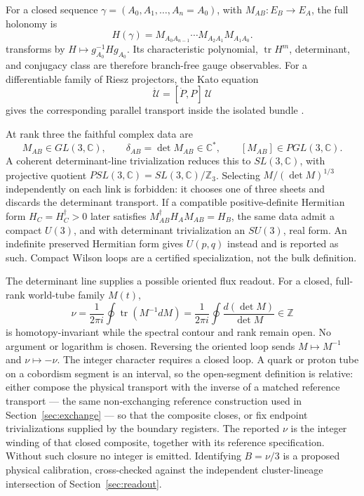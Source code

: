 \documentclass[11pt,letterpaper]{article}
\begin{document}
For a closed sequence
$\gamma=(A_0,A_1,\ldots,A_n=A_0)$, with $M_{AB}:E_B\to E_A$, the full
holonomy is
\begin{equation*}
  H(\gamma)
  =M_{A_0A_{n-1}}\cdots M_{A_2A_1}M_{A_1A_0}.
\end{equation*}
transforms by $H\mapsto g_{A_0}^{-1}Hg_{A_0}$. Its characteristic polynomial,
$\operatorname{tr}H^m$, determinant, and conjugacy class are therefore
branch-free gauge observables. For a differentiable family of Riesz
projectors, the Kato equation
\begin{equation*}
  \dot{\mathcal U}=[\dot P,P]\,\mathcal U
\end{equation*}
gives the corresponding parallel transport inside the isolated bundle
\cite{kato1995}.

At rank three the faithful complex data are
\begin{equation*}
  M_{AB}\in GL(3,\mathbb C),\qquad
  \delta_{AB}=\det M_{AB}\in\mathbb C^{*},\qquad
  [M_{AB}]\in PGL(3,\mathbb C).
\end{equation*}
A coherent determinant-line trivialization reduces this to
$SL(3,\mathbb C)$, with projective quotient
$PSL(3,\mathbb C)=SL(3,\mathbb C)/\mathbb Z_3$. Selecting
$M/(\det M)^{1/3}$ independently on each link is forbidden: it chooses one of
three sheets and discards the determinant transport. If a compatible
positive-definite Hermitian form $H_C=H_C^\dagger>0$ later satisfies
$M_{AB}^{\dagger}H_AM_{AB}=H_B$, the same data admit a compact
$U(3)$, and with determinant trivialization an $SU(3)$, real form. An
indefinite preserved Hermitian form gives $U(p,q)$ instead and is reported as
such. Compact Wilson loops are a certified specialization, not the bulk
definition.

The determinant line supplies a possible oriented flux readout. For a closed,
full-rank world-tube family $M(t)$,
\begin{equation*}
  \boxed{\,
  \nu=\frac{1}{2\pi i}\oint
  \operatorname{tr}\!\left(M^{-1}dM\right)
  =\frac{1}{2\pi i}\oint\frac{d(\det M)}{\det M}
  \in\mathbb Z\,}
\end{equation*}
is homotopy-invariant while the spectral contour and rank remain open. No
argument or logarithm is chosen. Reversing the oriented loop sends
$M\mapsto M^{-1}$ and $\nu\mapsto-\nu$. The integer character requires a
closed loop. A quark or proton tube on a cobordism segment is an interval, so
the open-segment definition is relative: either
compose the physical transport with the inverse of a matched reference
transport --- the same non-exchanging reference construction used in
Section~\ref{sec:exchange} --- so that the composite closes, or fix endpoint
trivializations supplied by the boundary registers. The reported $\nu$ is the
integer winding of that closed composite, together with its reference
specification. Without such closure no integer is emitted. Identifying
$B=\nu/3$ is a proposed physical calibration, cross-checked against the
independent cluster-lineage intersection of Section~\ref{sec:readout}.
\end{document}
